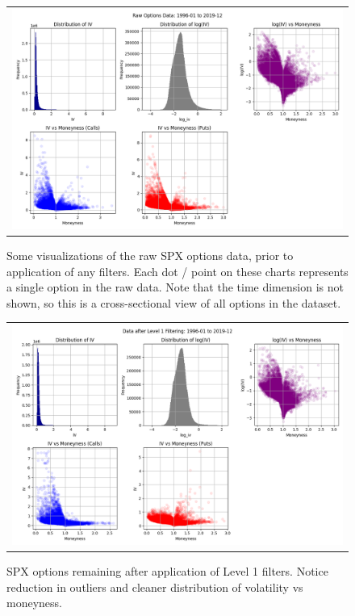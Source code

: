 \documentclass[11pt]{article}
\begin{document}
\begin{figure}[H]
  \centering
  \begin{tabular}{@{}c@{}}
    \includegraphics[width=\linewidth,height=0.666\linewidth]{../docs_src/RAW_1996-01_2019-12_iv.png}
  \end{tabular}
  \caption{Some visualizations of the raw SPX options data, prior to application of any filters. Each dot / point on these charts represents a single option in the raw data. Note that the time dimension is not shown, so this is a cross-sectional view of all options in the dataset.}
  \label{fig:raw_spx_options_data}
\end{figure}

\begin{figure}[H]
  \centering
  \begin{tabular}{@{}c@{}}
    \includegraphics[width=\linewidth,height=0.666\linewidth]{../docs_src/L1_1996-01_2019-12_iv.png}
  \end{tabular}
  \caption{SPX options remaining after application of Level 1 filters. Notice reduction in outliers and cleaner distribution of volatility vs moneyness.}
  \label{fig:l1_spx_options_data}
\end{figure}
\end{document}

